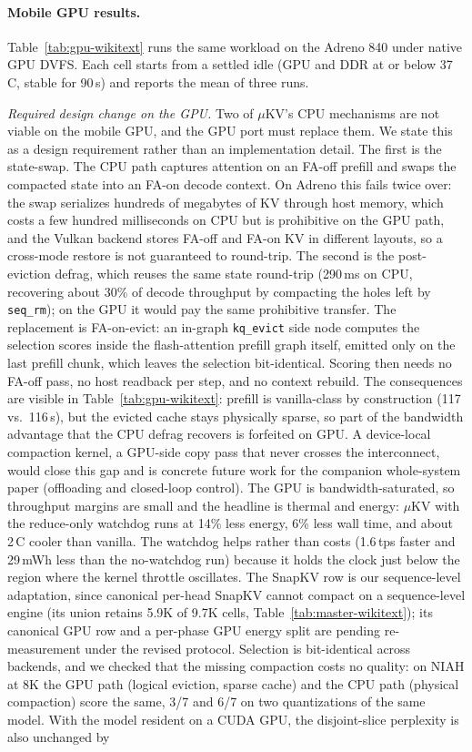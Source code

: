 \documentclass[sigconf, anonymous=false, screen=true]{acmart}
\begin{document}
\paragraph{Mobile GPU results.}\label{sec:gpu-results}
Table~\ref{tab:gpu-wikitext} runs the same workload on the Adreno 840 under native GPU DVFS. Each cell starts from a settled idle (GPU and DDR at or below 37\,\textdegree C, stable for 90\,s) and reports the mean of three runs.

\emph{Required design change on the GPU.} Two of $\mu$KV's CPU mechanisms are not viable on the mobile GPU, and the GPU port must replace them. We state this as a design requirement rather than an implementation detail. The first is the state-swap. The CPU path captures attention on an FA-off prefill and swaps the compacted state into an FA-on decode context. On Adreno this fails twice over: the swap serializes hundreds of megabytes of KV through host memory, which costs a few hundred milliseconds on CPU but is prohibitive on the GPU path, and the Vulkan backend stores FA-off and FA-on KV in different layouts, so a cross-mode restore is not guaranteed to round-trip. The second is the post-eviction defrag, which reuses the same state round-trip (290\,ms on CPU, recovering about 30\% of decode throughput by compacting the holes left by \texttt{seq\_rm}); on the GPU it would pay the same prohibitive transfer. The replacement is FA-on-evict: an in-graph \texttt{kq\_evict} side node computes the selection scores inside the flash-attention prefill graph itself, emitted only on the last prefill chunk, which leaves the selection bit-identical. Scoring then needs no FA-off pass, no host readback per step, and no context rebuild. The consequences are visible in Table~\ref{tab:gpu-wikitext}: prefill is vanilla-class by construction (117 vs.\ 116\,s), but the evicted cache stays physically sparse, so part of the bandwidth advantage that the CPU defrag recovers is forfeited on GPU. A device-local compaction kernel, a GPU-side copy pass that never crosses the interconnect, would close this gap and is concrete future work for the companion whole-system paper (offloading and closed-loop control). The GPU is bandwidth-saturated, so throughput margins are small and the headline is thermal and energy: $\mu$KV with the reduce-only watchdog runs at 14\% less energy, 6\% less wall time, and about 2\,\textdegree C cooler than vanilla. The watchdog helps rather than costs (1.6\,tps faster and 29\,mWh less than the no-watchdog run) because it holds the clock just below the region where the kernel throttle oscillates. The SnapKV row is our sequence-level adaptation, since canonical per-head SnapKV cannot compact on a sequence-level engine (its union retains 5.9K of 9.7K cells, Table~\ref{tab:master-wikitext}); its canonical GPU row and a per-phase GPU energy split are pending re-measurement under the revised protocol. Selection is bit-identical across backends, and we checked that the missing compaction costs no quality: on NIAH at 8K the GPU path (logical eviction, sparse cache) and the CPU path (physical compaction) score the same, 3/7 and 6/7 on two quantizations of the same model. With the model resident on a CUDA GPU, the disjoint-slice perplexity is also unchanged by 
\end{document}
